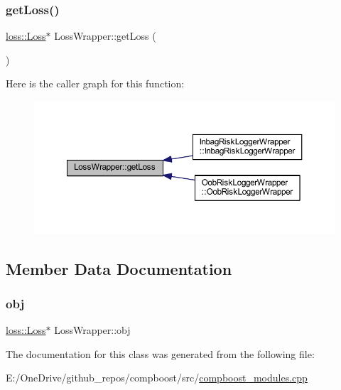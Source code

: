 \subsubsection{\texorpdfstring{get\+Loss()}{getLoss()}}
{\footnotesize\ttfamily \mbox{\hyperlink{classloss_1_1_loss}{loss\+::\+Loss}}$\ast$ Loss\+Wrapper\+::get\+Loss (\begin{DoxyParamCaption}{ }\end{DoxyParamCaption})\hspace{0.3cm}{\ttfamily [inline]}}

Here is the caller graph for this function\+:\nopagebreak
\begin{figure}[H]
\begin{center}
\leavevmode
\includegraphics[width=350pt]{class_loss_wrapper_a7b1abc6f1d1fd9c2fbc439ee32a0f844_icgraph}
\end{center}
\end{figure}


\subsection{Member Data Documentation}
\mbox{\label{class_loss_wrapper_a2902226f55d916ef64fdd4da3179630a}} 
\subsubsection{\texorpdfstring{obj}{obj}}
{\footnotesize\ttfamily \mbox{\hyperlink{classloss_1_1_loss}{loss\+::\+Loss}}$\ast$ Loss\+Wrapper\+::obj\hspace{0.3cm}{\ttfamily [protected]}}



The documentation for this class was generated from the following file\+:\begin{DoxyCompactItemize}
\item 
E\+:/\+One\+Drive/github\+\_\+repos/compboost/src/\mbox{\hyperlink{compboost__modules_8cpp}{compboost\+\_\+modules.\+cpp}}\end{DoxyCompactItemize}
